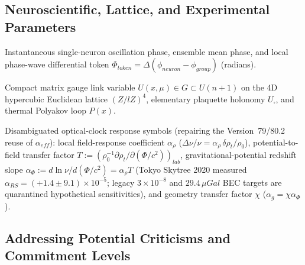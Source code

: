 \documentclass[american,11pt,letterpaper]{article}
\def\mathbb#1{#1}%
\def\mathbf#1{#1}%
\def\mathcal#1{#1}%
\def\mathrm#1{#1}%
\begin{document}
\subsection*{Neuroscientific, Lattice, and Experimental Parameters}

\begin{description}[leftmargin=2.4cm, style=nextline]
  \item[$\phi_{\mathrm{neuron}},\,\phi_{\mathrm{group}},\,\Phi_{\mathrm{token}}$] Instantaneous single-neuron oscillation phase, ensemble mean phase, and local phase-wave differential token $\Phi_{\mathrm{token}} = \Delta(\phi_{\mathrm{neuron}} - \phi_{\mathrm{group}})$ (radians).
  \item[$U(x,\mu),\,U_\square,\,P(\mathbf{x})$] Compact matrix gauge link variable $U(x,\mu) \in G \subset U(n+1)$ on the 4D hypercubic Euclidean lattice $(\mathbb{Z}/l\mathbb{Z})^4$, elementary plaquette holonomy $U_\square$, and thermal Polyakov loop $P(\mathbf{x})$.
  \item[$\alpha_\rho,\,\mathcal{T},\,\alpha_\Phi,\,\chi$] Disambiguated optical-clock response symbols (repairing the Version~79/80.2 reuse of $\alpha_{\mathrm{eff}}$): local field-response coefficient $\alpha_\rho$ ($\Delta\nu/\nu = \alpha_\rho\,\delta\rho_t/\rho_0$), potential-to-field transfer factor $\mathcal{T} := (\rho_0^{-1}\partial\rho_t/\partial(\Phi/c^2))_{\mathrm{lab}}$, gravitational-potential redshift slope $\alpha_\Phi := d\ln\nu / d(\Phi/c^2) = \alpha_\rho\mathcal{T}$ (Tokyo Skytree 2020 measured $\alpha_{\mathrm{RS}} = (+1.4\pm 9.1)\times 10^{-5}$; legacy $3\times 10^{-8}$ and $29.4\,\mu\mathrm{Gal}$ BEC targets are quarantined hypothetical sensitivities), and geometry transfer factor $\chi$ ($\alpha_g = \chi\alpha_\Phi$).
\end{description}

\subsection{Addressing Potential Criticisms and Commitment Levels}
\end{document}
